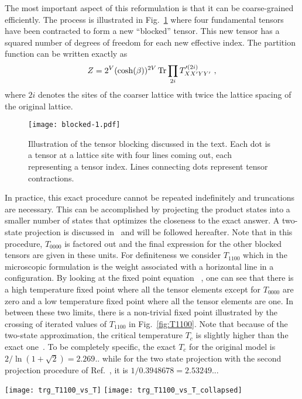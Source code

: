 \documentclass[../main.tex]{subfiles}
\begin{document}
The most important aspect of this reformulation is that it can be coarse-grained efficiently.  The process is
illustrated in Fig.~\ref{fig:unit_block} where four fundamental tensors have been contracted to form a new ``blocked''
tensor.  This new tensor has a squared number of degrees of freedom for each new effective index. The partition
function can be written exactly as 
\begin{equation*}
    Z= 2^V(\cosh (\beta))^{2V}\operatorname{Tr}\prod_{2i}T'^{(2i)}_{XX'YY'} \ , 
    \label{eq:ZP}
\end{equation*}
where $2i$ denotes the sites of the coarser lattice with twice the lattice spacing of the original lattice. 
\begin{figure}[htpb]
    \centering
    \texttt{[image: blocked-1.pdf]}
    \caption{Illustration of the tensor blocking discussed in the text.  Each dot is a tensor at a lattice site with
    four lines coming out, each representing a tensor index.  Lines connecting dots represent tensor contractions.}
    \label{fig:unit_block}
\end{figure}
In practice, this exact procedure cannot be repeated indefinitely and truncations are necessary. This can be
accomplished by projecting the product states into a smaller number of states that optimizes the closeness to the exact
answer.  A two-state projection is discussed in~\cite{prb87} and will be followed hereafter. Note that in this
procedure, $T_{0000}$ is factored out and the final expression for the other blocked tensors are given in these units.
For definiteness we consider $T_{1100}$ which in the microscopic formulation is the weight associated with a horizontal
line in a \lc  configuration. By looking at the fixed point equation~\cite{prb87} , one can see that there is a high
temperature fixed point where all the tensor elements except for $T_{0000}$ are zero and a low temperature fixed point
where all the tensor elements are one. In between these two limits, there is a non-trivial fixed point illustrated by
the crossing of iterated values of $T_{1100}$ in Fig.~\ref{fig:T1100}. Note that because of the two-state
approximation, the critical temperature $T_c$ is slightly higher than the exact one~\cite{prb87}.  To be completely
specific, the exact $T_c$ for the original model is $2/\ln(1+\sqrt{2})=2.269 ..$ while for the two state projection
with the second projection procedure of Ref.~\cite{prb87}, it is $1/0.3948678 =2.53249...$
\begin{figure*}[htpb]
    \centering 
     \texttt{[image: trg\_T1100\_vs\_T]}
     \texttt{[image: trg\_T1100\_vs\_T\_collapsed]}
     \caption{(a) $T_{1100}$ vs. $T - T_c^{(2s)}$ for six successive iterations of the blocking transformation,
     beginning with an initial lattice $L = 64$; (b) $T_{1100}$ vs. $(T - T_{c}^{(2s)}) / L_{eff}$ illustrating the
     data collapse, where $T_{c}^{(2s)}$ is the critical temperature of the two state projection, beginning at
     iteration 0 on an $L = 64$ lattice.} 
     \label{fig:T1100}
\end{figure*}
\end{document}
